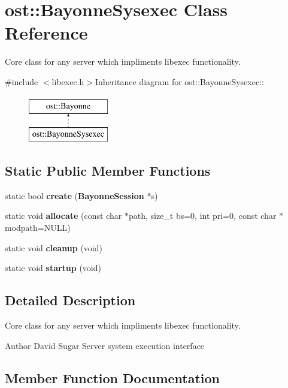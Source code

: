 \section{ost::BayonneSysexec Class Reference}
\label{classost_1_1_bayonne_sysexec}


Core class for any server which impliments libexec functionality.  


{\ttfamily \#include $<$libexec.h$>$}Inheritance diagram for ost::BayonneSysexec::\begin{figure}[H]
\begin{center}
\leavevmode
\includegraphics[height=2cm]{classost_1_1_bayonne_sysexec}
\end{center}
\end{figure}
\subsection*{Static Public Member Functions}
\begin{DoxyCompactItemize}
\item 
static bool {\bf create} ({\bf BayonneSession} $\ast$s)
\item 
static void {\bf allocate} (const char $\ast$path, size\_\-t bs=0, int pri=0, const char $\ast$modpath=NULL)
\item 
static void {\bf cleanup} (void)
\item 
static void {\bf startup} (void)
\end{DoxyCompactItemize}


\subsection{Detailed Description}
Core class for any server which impliments libexec functionality. \begin{DoxyAuthor}{Author}
David Sugar Server system execution interface 
\end{DoxyAuthor}


\subsection{Member Function Documentation}
